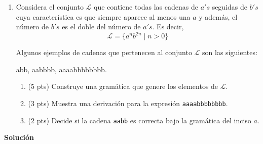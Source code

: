 \documentclass[11pt,letterpaper]{article}
\begin{document}
\begin{enumerate}
    \item Considera el conjunto $\mathcal{L}$ que contiene todas las cadenas de
    $a's$ seguidas de $b's$ cuya característica es que siempre aparece al menos
    una $a$ y además, el número de $b's$ es el doble del número de $a's$. Es decir,
        \begin{equation}
            \mathcal{L} = \{ a^n b^{2n} \mid n > 0\}
        \end{equation}

    Algunos ejemplos de cadenas que pertenecen al conjunto $\mathcal{L}$ son las
    siguientes: {\ttfamily abb, aabbbb, aaaabbbbbbbb. \par}

    \begin{enumerate}
        \item (5 pts) Construye una gramática que genere los elementos de $\mathcal{L}$.
        \item (3 pts) Muestra una derivación para la expresión \texttt{aaaabbbbbbbb}.
        \item (2 pts) Decide si la cadena \texttt{aabb} es correcta bajo la gramática
        del inciso $a$.
    \end{enumerate}

\end{enumerate}

{\large \bfseries Solución \par}
\end{document}
